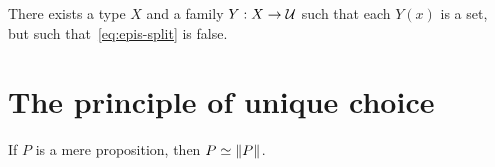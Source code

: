 \documentclass[hott-all.tex]{subfiles}
\begin{document}
\begin{lem}\label{thm:no-higher-ac}
  There exists a type $X$ and a family $Y:X\to \mathcal{U}$ such that each $Y(x)$ is a set, but such that~\eqref{eq:epis-split} is false.
\end{lem}

%
%
%

\section{The principle of unique choice}
\label{sec:unique-choice}

%

\begin{lem}\label{thm:prop-equiv-trunc}
  If $P$ is a mere proposition, then $P \simeq \mathopen{}\left\Vert P\right\Vert_{}\mathclose{}$.
\end{lem}
%
%
\end{document}
